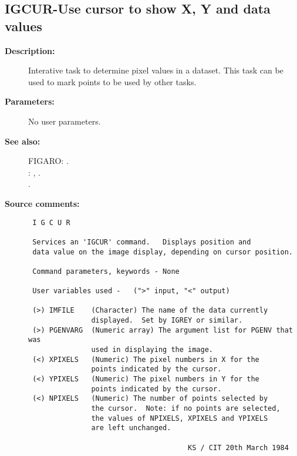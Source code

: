 \subsection{IGCUR-\label{IGCUR}Use cursor to show X, Y and data values}
\begin{description}

\item [{\bf Description:}]
 Interative task to determine pixel values in a dataset.
 This task can be used to mark points to be used by other
 tasks.

\item [{\bf Parameters:}]
 No user parameters.

\item [{\bf See also:}]
FIGARO: . \\
: , .\\
.\\


\item [{\bf Source comments:}]
\begin{verbatim}
 I G C U R

 Services an 'IGCUR' command.   Displays position and
 data value on the image display, depending on cursor position.

 Command parameters, keywords - None

 User variables used -   (">" input, "<" output)

 (>) IMFILE    (Character) The name of the data currently
               displayed.  Set by IGREY or similar.
 (>) PGENVARG  (Numeric array) The argument list for PGENV that was
               used in displaying the image.
 (<) XPIXELS   (Numeric) The pixel numbers in X for the
               points indicated by the cursor.
 (<) YPIXELS   (Numeric) The pixel numbers in Y for the
               points indicated by the cursor.
 (<) NPIXELS   (Numeric) The number of points selected by
               the cursor.  Note: if no points are selected,
               the values of NPIXELS, XPIXELS and YPIXELS
               are left unchanged.

                                      KS / CIT 20th March 1984
\end{verbatim}
\end{description}
